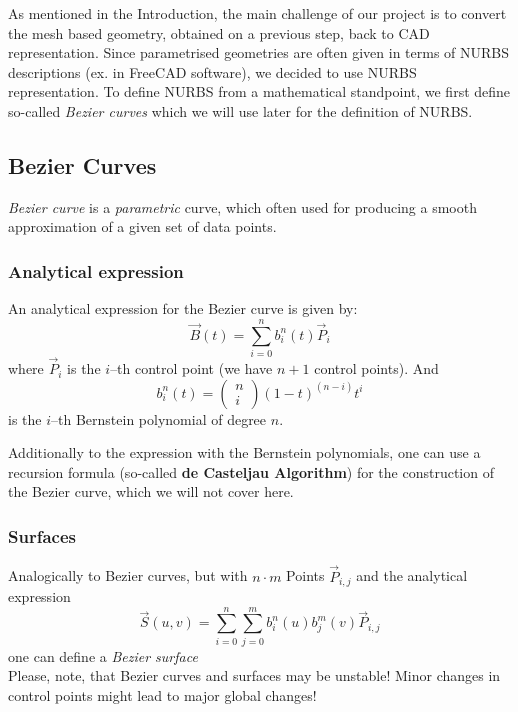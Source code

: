 As mentioned in the Introduction, the main challenge of our project is to convert the mesh based geometry, obtained on a previous step, back to CAD representation. Since parametrised geometries are often given in terms of NURBS descriptions (ex. in FreeCAD software), we decided to use NURBS representation.  To define NURBS from a mathematical standpoint, we first define so-called \textit{Bezier curves} which we will use later for the definition of NURBS.
\subsection{Bezier Curves}
\emph{Bezier curve} is a \textit{parametric} curve, which often used for producing a smooth approximation of a given set of data points.
\subsubsection{Analytical expression} 
An analytical expression for the Bezier curve is given by:
\begin{equation*}
\vec{B}(t)=\sum\limits_{i=0}^n b_i^n(t) \vec{P}_i
\end{equation*}
where $\vec{P}_i$ is the $i$--th control point (we have $n+1$ control points). And
\begin{equation*}
b_i^n(t)=\left(\begin{array}{c}n\\i\end{array}\right)(1-t)^{(n-i)}t^i
\end{equation*}
is the $i$--th Bernstein polynomial of degree $n$.

Additionally to the expression with the Bernstein polynomials, one can use a recursion formula (so-called \textbf{de Casteljau Algorithm}) for the construction of the Bezier curve, which we will not cover here.
\subsubsection{Surfaces}
Analogically to Bezier curves, but with $n\cdot m$ Points $\vec{P}_{i,j}$ and the analytical expression
\begin{equation*}
\vec{S}(u,v)=\sum\limits_{i=0}^n \sum\limits_{j=0}^m b_i^n(u) b_j^m(v) \vec{P}_{i,j}
\end{equation*}
one can define a \textit{Bezier surface}
\\
Please, note, that Bezier curves and surfaces may be unstable! Minor changes in control points might lead to major global changes!



